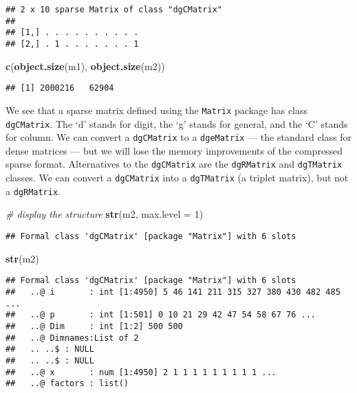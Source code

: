 \documentclass[]{article}
\newenvironment{Shaded}{\begin{snugshade}}{\end{snugshade}}
\newcommand{\CommentTok}[1]{\textcolor[rgb]{0.56,0.35,0.01}{\textit{#1}}}
\newcommand{\DataTypeTok}[1]{\textcolor[rgb]{0.13,0.29,0.53}{#1}}
\newcommand{\DecValTok}[1]{\textcolor[rgb]{0.00,0.00,0.81}{#1}}
\newcommand{\KeywordTok}[1]{\textcolor[rgb]{0.13,0.29,0.53}{\textbf{#1}}}
\newcommand{\NormalTok}[1]{#1}
\begin{document}
\begin{verbatim}
## 2 x 10 sparse Matrix of class "dgCMatrix"
##                         
## [1,] . . . . . . . . . .
## [2,] . 1 . . . . . . . 1
\end{verbatim}

\begin{Shaded}
\begin{Highlighting}[]
\KeywordTok{c}\NormalTok{(}\KeywordTok{object.size}\NormalTok{(m1), }\KeywordTok{object.size}\NormalTok{(m2))}
\end{Highlighting}
\end{Shaded}

\begin{verbatim}
## [1] 2000216   62904
\end{verbatim}

We see that a sparse matrix defined using the \texttt{Matrix} package
has class \texttt{dgCMatrix}. The `d' stands for digit, the `g' stands
for general, and the `C' stands for column. We can convert a
\texttt{dgCMatrix} to a \texttt{dgeMatrix} --- the standard class for
dense matrices --- but we will lose the memory improvements of the
compressed sparse format. Alternatives to the \texttt{dgCMatrix} are the
\texttt{dgRMatrix} and \texttt{dgTMatrix} classes. We can convert a
\texttt{dgCMatrix} into a \texttt{dgTMatrix} (a triplet matrix), but not
a \texttt{dgRMatrix}.

\begin{Shaded}
\begin{Highlighting}[]
\CommentTok{# display the structure}
\KeywordTok{str}\NormalTok{(m2, }\DataTypeTok{max.level =} \DecValTok{1}\NormalTok{)}
\end{Highlighting}
\end{Shaded}

\begin{verbatim}
## Formal class 'dgCMatrix' [package "Matrix"] with 6 slots
\end{verbatim}

\begin{Shaded}
\begin{Highlighting}[]
\KeywordTok{str}\NormalTok{(m2)}
\end{Highlighting}
\end{Shaded}

\begin{verbatim}
## Formal class 'dgCMatrix' [package "Matrix"] with 6 slots
##   ..@ i       : int [1:4950] 5 46 141 211 315 327 380 430 482 485 ...
##   ..@ p       : int [1:501] 0 10 21 29 42 47 54 58 67 76 ...
##   ..@ Dim     : int [1:2] 500 500
##   ..@ Dimnames:List of 2
##   .. ..$ : NULL
##   .. ..$ : NULL
##   ..@ x       : num [1:4950] 2 1 1 1 1 1 1 1 1 1 ...
##   ..@ factors : list()
\end{verbatim}
\end{document}
